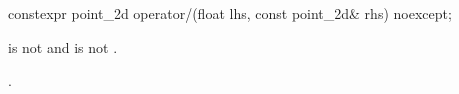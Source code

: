 %
\begin{itemdecl}
constexpr point_2d operator/(float lhs, const point_2d& rhs) noexcept;
\end{itemdecl}
\begin{itemdescr}
\pnum
\requires
{} is not  and  is not .

\pnum
\returns
{}.
\end{itemdescr}
